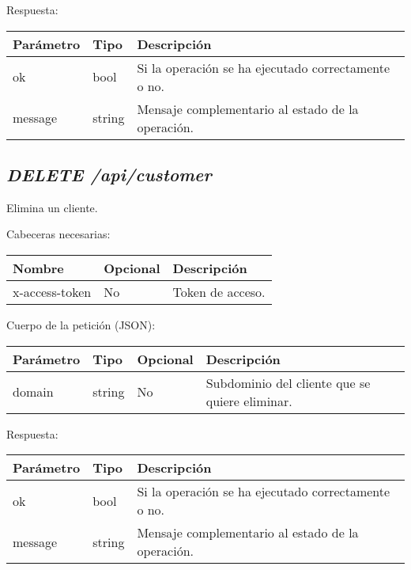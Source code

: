 Respuesta:
\begin{table}[!h]
	\centering
	\begin{adjustbox}{max width=\textwidth}
	\begin{tabular}{|l|l|l|}
		\hline
		Parámetro & Tipo & Descripción \\ \hline
		ok & bool & Si la operación se ha ejecutado correctamente o no. \\ \hline
		message & string & Mensaje complementario al estado de la operación. \\ \hline
	\end{tabular}
\end{adjustbox}
\end{table}






\subsection{\textit{DELETE /api/customer}}
Elimina un cliente.

Cabeceras necesarias:
\begin{table}[h!]
	\centering
	\begin{adjustbox}{max width=\textwidth}
	\begin{tabular}{|l|l|l|}
		\hline
		Nombre & Opcional & Descripción \\ \hline
		x-access-token & No & Token de acceso. \\ \hline
	\end{tabular}
\end{adjustbox}
\end{table}

Cuerpo de la petición (JSON):
\begin{table}[!h]
	\centering
	\begin{adjustbox}{max width=\textwidth}
	\begin{tabular}{|l|l|l|l|}
		\hline
		Parámetro & Tipo & Opcional & Descripción \\ \hline
		domain & string & No & Subdominio del cliente que se quiere eliminar. \\ \hline
	\end{tabular}
\end{adjustbox}
\end{table}

Respuesta:
\begin{table}[!h]
	\centering
	\begin{adjustbox}{max width=\textwidth}
	\begin{tabular}{|l|l|l|}
		\hline
		Parámetro & Tipo & Descripción \\ \hline
		ok & bool & Si la operación se ha ejecutado correctamente o no. \\ \hline
		message & string & Mensaje complementario al estado de la operación. \\ \hline
	\end{tabular}
\end{adjustbox}
\end{table}



